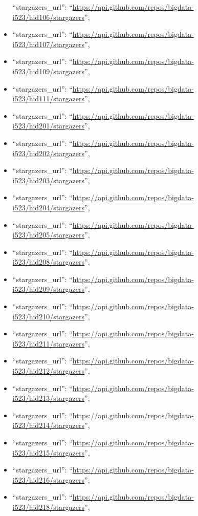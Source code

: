 \begin{itemize}
  ``stargazers\_url'':
  ``\url{https://api.github.com/repos/bigdata-i523/hid106/stargazers}'',
\item
  ``stargazers\_url'':
  ``\url{https://api.github.com/repos/bigdata-i523/hid107/stargazers}'',
\item
  ``stargazers\_url'':
  ``\url{https://api.github.com/repos/bigdata-i523/hid109/stargazers}'',
\item
  ``stargazers\_url'':
  ``\url{https://api.github.com/repos/bigdata-i523/hid111/stargazers}'',
\item
  ``stargazers\_url'':
  ``\url{https://api.github.com/repos/bigdata-i523/hid201/stargazers}'',
\item
  ``stargazers\_url'':
  ``\url{https://api.github.com/repos/bigdata-i523/hid202/stargazers}'',
\item
  ``stargazers\_url'':
  ``\url{https://api.github.com/repos/bigdata-i523/hid203/stargazers}'',
\item
  ``stargazers\_url'':
  ``\url{https://api.github.com/repos/bigdata-i523/hid204/stargazers}'',
\item
  ``stargazers\_url'':
  ``\url{https://api.github.com/repos/bigdata-i523/hid205/stargazers}'',
\item
  ``stargazers\_url'':
  ``\url{https://api.github.com/repos/bigdata-i523/hid208/stargazers}'',
\item
  ``stargazers\_url'':
  ``\url{https://api.github.com/repos/bigdata-i523/hid209/stargazers}'',
\item
  ``stargazers\_url'':
  ``\url{https://api.github.com/repos/bigdata-i523/hid210/stargazers}'',
\item
  ``stargazers\_url'':
  ``\url{https://api.github.com/repos/bigdata-i523/hid211/stargazers}'',
\item
  ``stargazers\_url'':
  ``\url{https://api.github.com/repos/bigdata-i523/hid212/stargazers}'',
\item
  ``stargazers\_url'':
  ``\url{https://api.github.com/repos/bigdata-i523/hid213/stargazers}'',
\item
  ``stargazers\_url'':
  ``\url{https://api.github.com/repos/bigdata-i523/hid214/stargazers}'',
\item
  ``stargazers\_url'':
  ``\url{https://api.github.com/repos/bigdata-i523/hid215/stargazers}'',
\item
  ``stargazers\_url'':
  ``\url{https://api.github.com/repos/bigdata-i523/hid216/stargazers}'',
\item
  ``stargazers\_url'':
  ``\url{https://api.github.com/repos/bigdata-i523/hid218/stargazers}'',

\end{itemize}
